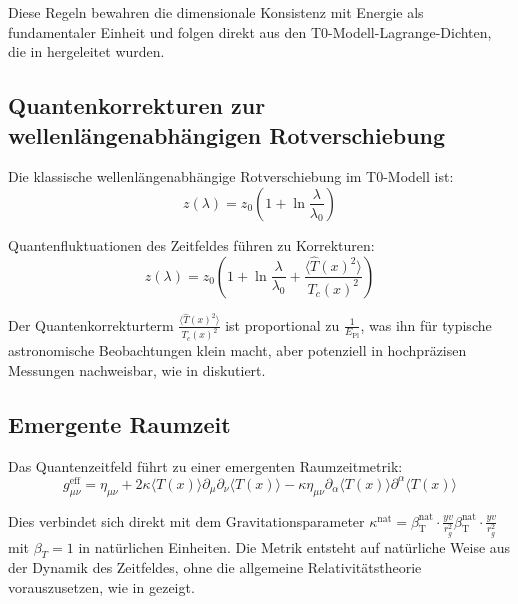 \documentclass[12pt,a4paper]{article}
\newcommand{\betaT}{\beta_{\text{T}}}
\begin{document}
	Diese Regeln bewahren die dimensionale Konsistenz mit Energie als fundamentaler Einheit und folgen direkt aus den T0-Modell-Lagrange-Dichten, die in \cite{Pascher2025Fields} hergeleitet wurden.
	
	\subsection{Quantenkorrekturen zur wellenlängenabhängigen Rotverschiebung}
	\label{subsec:quantum_redshift}
	
	Die klassische wellenlängenabhängige Rotverschiebung im T0-Modell ist:
	\begin{equation}
		z(\lambda) = z_0\left(1 + \ln\frac{\lambda}{\lambda_0}\right)
		\label{eq:classical_redshift}
	\end{equation}
	
	Quantenfluktuationen des Zeitfeldes führen zu Korrekturen:
	\begin{equation}
		z(\lambda) = z_0\left(1 + \ln\frac{\lambda}{\lambda_0} + \frac{\langle \hat{T}(x)^2 \rangle}{T_c(x)^2}\right)
		\label{eq:quantum_redshift}
	\end{equation}
	
	Der Quantenkorrekturterm $\frac{\langle \hat{T}(x)^2 \rangle}{T_c(x)^2}$ ist proportional zu $\frac{1}{E_{\text{Pl}}}$, was ihn für typische astronomische Beobachtungen klein macht, aber potenziell in hochpräzisen Messungen nachweisbar, wie in \cite{Pascher2025Measurements} diskutiert.
	
	\subsection{Emergente Raumzeit}
	\label{subsec:emergent_spacetime}
	
	Das Quantenzeitfeld führt zu einer emergenten Raumzeitmetrik:
	\begin{equation}
		g_{\mu\nu}^{\text{eff}} = \eta_{\mu\nu} + 2\kappa\langle T(x) \rangle \partial_{\mu}\partial_{\nu}\langle T(x) \rangle - \kappa\eta_{\mu\nu}\partial_{\alpha}\langle T(x) \rangle \partial^{\alpha}\langle T(x) \rangle
		\label{eq:emergent_metric}
	\end{equation}
	
	Dies verbindet sich direkt mit dem Gravitationsparameter $\kappa^{\text{nat}} = \betaT^{\text{nat}} \cdot \frac{yv}{r_g^2}\betaT^{\text{nat}} \cdot \frac{yv}{r_g^2}$ mit $\beta_T = 1$ in natürlichen Einheiten. Die Metrik entsteht auf natürliche Weise aus der Dynamik des Zeitfeldes, ohne die allgemeine Relativitätstheorie vorauszusetzen, wie in \cite{Pascher2025EmergentGrav} gezeigt.
	
\end{document}

